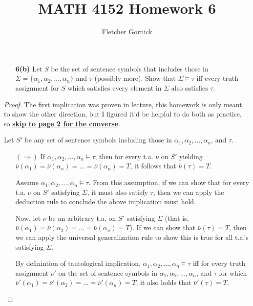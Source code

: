\documentclass[11pt]{article}
\newcommand{\n}{\vspace{0.5cm}}
\begin{document}
\title{\vspace{-1.5cm}MATH 4152 Homework 6}
  \author{Fletcher Gornick}
  \maketitle
  \begin{enumerate}
    \item[\textbf{6(b)}] Let \(S\) be the set of sentence symbols that includes those in \(\Sigma = \{\alpha_1, \alpha_2, \hdots, \alpha_n\}\) and \(\tau\) (possibly more).  Show that \(\Sigma \vDash \tau\) iff every truth assignment for \(S\) which satisfies every element in \(\Sigma\) also satisfies \(\tau\).
  \end{enumerate}

  \begin{proof}
    The first implication was proven in lecture, this homework is only meant to show the other direction, but I figured it'd be helpful to do both as practice, so \underline{\textbf{skip to page 2 for the converse}}. \n

    Let \(S'\) be any set of sentence symbols including those in \(\alpha_1, \alpha_2, \hdots, \alpha_n\), and \(\tau\).
    \begin{enumerate}
      \item[\((\Rightarrow)\)] If \(\alpha_1, \alpha_2, \hdots, \alpha_n \vDash \tau\), then for every t.a. \(\nu\) on \(S'\) yielding \(\bar\nu(\alpha_1) = \bar\nu(\alpha_n) = \hdots = \bar\nu(\alpha_n) = T\), it follows that \(\bar\nu(\tau) = T\). \n

        Assume \(\alpha_1, \alpha_2, \hdots, \alpha_n \vDash \tau\).  From this assumption, if we can show that for every t.a. \(\nu\) on \(S'\) satisfying \(\Sigma\), it must also satisfy \(\tau\), then we can apply the deduction rule to conclude the above implication must hold. \n

        Now, let \(\nu\) be an arbitrary t.a. on \(S'\) satisfying \(\Sigma\) (that is, \(\bar\nu(\alpha_1) = \bar\nu(\alpha_2) = \hdots = \bar\nu(\alpha_n) = T\)).  If we can show that \(\bar\nu(\tau) = T\), then we can apply the universal generalization rule to show this is true for all t.a.'s satisfying \(\Sigma\). \n

        By definintion of tautological implication, \(\alpha_1, \alpha_2, \hdots, \alpha_n \vDash \tau\) iff for every truth assignment \(\nu'\) on the set of sentence symbols in \(\alpha_1, \alpha_2, \hdots, \alpha_n\), and \(\tau\) for which \(\bar\nu'(\alpha_1) = \bar\nu'(\alpha_2) = \hdots = \bar\nu'(\alpha_n) = T\), it also holds that \(\bar\nu'(\tau) = T\). \n


\end{enumerate}
\end{proof}
\end{document}
